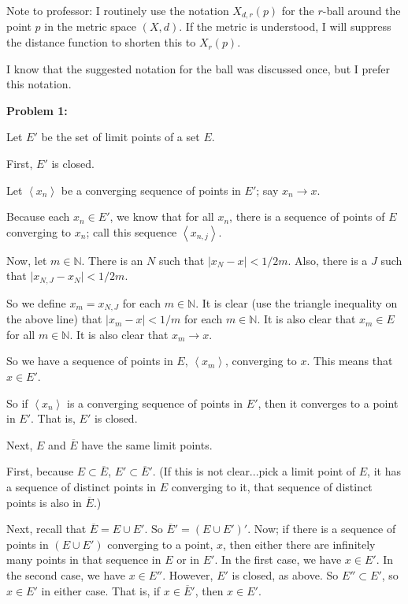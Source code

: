 \documentclass[a4paper,12pt]{article}
\newcommand{\tab}{\hspace{4mm}} %
\newcommand{\absval}[1]{\lvert #1 \rvert}
\newcommand{\anbrack}[1]{\left\langle #1 \right\rangle}
\newcommand{\N}{\mathbb{N}}
\begin{document}
Note to professor: I routinely use the notation $X_{d,r}(p)$ for the $r$-ball around the point $p$ in the metric space $(X,d)$. If the metric is understood, I will suppress the distance function to shorten this to $X_r(p)$.

I know that the suggested notation for the ball was discussed once, but I prefer this notation.

{\bf Problem 1:}

Let $E'$ be the set of limit points of a set $E$.

First, $E'$ is closed.

\tab Let $\anbrack{x_n}$ be a converging sequence of points in $E'$; say $x_n \to x$.

\tab Because each $x_n \in E'$, we know that for all $x_n$, there is a sequence of points of $E$ converging to $x_n$; call this sequence $\anbrack{x_{n,j}}$. 

\tab Now, let $m \in \N$. There is an $N$ such that $\absval{x_N - x} < 1/2m$. Also, there is a $J$ such that $\absval{x_{N,J} - x_N} < 1/2m$.

\tab So we define $x_m = x_{N,J}$ for each $m \in \N$. It is clear (use the triangle inequality on the above line) that $\absval{x_m-x} < 1/m$ for each $m \in \N$. It is also clear that $x_m \in E$ for all $m \in \N$. It is also clear that $x_m \to x$.

\tab So we have a sequence of points in $E$, $\anbrack{x_m}$, converging to $x$. This means that $x \in E'$.

\tab So if $\anbrack{x_n}$ is a converging sequence of points in $E'$, then it converges to a point in $E'$. That is, $E'$ is closed.

Next, $E$ and $\overline{E}$ have the same limit points.

\tab First, because $E \subset \overline{E}$, $E' \subset \overline{E}'$. (If this is not clear...pick a limit point of $E$, it has a sequence of distinct points in $E$ converging to it, that sequence of distinct points is also in $\overline{E}$.)

\tab Next, recall that $\overline{E} = E \cup E'$. So $\overline{E}' = (E \cup E')'$. Now; if there is a sequence of points in $(E \cup E')$ converging to a point, $x$, then either there are infinitely many points in that sequence in $E$ or in $E'$. In the first case, we have $x \in E'$. In the second case, we have $x \in E''$. However, $E'$ is closed, as above. So $E'' \subset E'$, so $x \in E'$ in either case. That is, if $x \in \overline{E}'$, then $x \in E'$.
\end{document}
